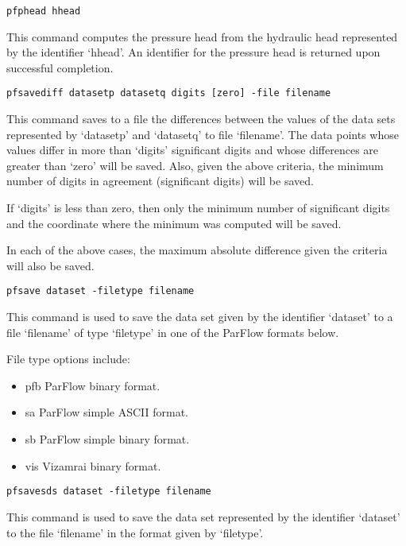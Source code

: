 \begin{description}
\item{\begin{verbatim}pfphead hhead\end{verbatim}}
This command computes the pressure head from the hydraulic head   
represented by the identifier `hhead'.  An identifier for the pressure
head is returned upon successful completion.
        
\item{\begin{verbatim}pfsavediff datasetp datasetq digits [zero] -file filename
\end{verbatim}}
This command saves to a file the differences between the values
of the data sets represented by `datasetp' and `datasetq' to file
`filename'.  The data points whose values differ in more than         
`digits' significant digits and whose differences are greater than  
`zero' will be saved.  Also, given the above criteria, the
minimum number of digits in agreement (significant digits) will be    
saved.

If `digits' is less than zero, then only the minimum number of
significant digits and the coordinate where the minimum was
computed will be saved.

In each of the above cases, the maximum absolute difference given
the criteria will also be saved.

\item{\begin{verbatim}pfsave dataset -filetype filename\end{verbatim}}
This command is used to save the data set given by the identifier
`dataset' to a file `filename' of type `filetype' in one of the
ParFlow formats below.

File type options include:
\begin{itemize}
\item{pfb}  ParFlow binary format.
\item{sa}  ParFlow simple ASCII format.
\item{sb}  ParFlow simple binary format.
\item{vis}  Vizamrai binary format.
\end{itemize}

\item{\begin{verbatim}pfsavesds dataset -filetype filename\end{verbatim}}
This command is used to save the data set represented by the
identifier `dataset' to the file `filename' in the format given by    
`filetype'.  


\end{description}
